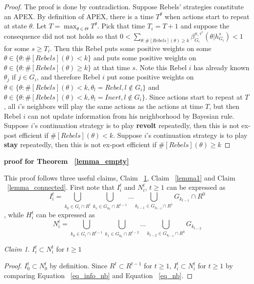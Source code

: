 \documentclass[12pt,letter]{article}
\theoremstyle{definition}
\theoremstyle{remark}
\theoremstyle{claim}
\newtheorem{claim}{Claim}
\begin{document}
\begin{proof}
The proof is done by contradiction. Suppose Rebels' strategies constitute an APEX. By definition of APEX, there is a time $T^{\theta}$ when actions start to repeat at state $\theta$. Let $T=\max_{\theta\in \Theta}{T^{\theta}}$. Pick that time $T_i=T+1$ and suppose the consequence did not not holds so that $0<\sum_{\theta:\#[Rebels](\theta)\geq k}\beta^{\pi,\tau^*}_{G_i}(\theta|h^{s}_{G_i})<1$ for some $s\geq T_i$. Then this Rebel puts some positive weights on some $\theta\in \{\theta:\#[Rebels](\theta)< k\}$ and puts some positive weights on $\theta\in \{\theta:\#[Rebels](\theta)\geq k\}$ at that time $s$. Note this Rebel $i$ has already known $\theta_j$ if $j\in G_i$, and therefore Rebel $i$ put some positive weights on $\theta\in \{\theta:\#[Rebels](\theta)< k, \theta_l=Rebel, l\notin G_i\}$ and $\theta\in \{\theta:\#[Rebels](\theta)< k, \theta_l=Inert, l\notin G_i\}$. Since actions start to repeat at $T$, all $i$'s neighbors will play the same actions as the actions at time $T$, but then Rebel $i$ can not update information from his neighborhood by Bayesian rule. Suppose $i$'s continuation strategy is to play \textbf{revolt} repeatedly, then this is not ex-post efficient if $\#[Rebels](\theta)< k$. Suppose $i$'s continuation strategy is to play \textbf{stay} repeatedly, then this is not ex-post efficient if $\#[Rebels](\theta)\geq k$
\end{proof}

\bigskip
\noindent\textbf{proof for Theorem ~\ref{lemma_empty}}

This proof follows three useful claims, Claim ~\ref{lemma_I_subset_N}, Claim ~\ref{lemma1} and Claim ~\ref{lemma_connected}. First note that $I^t_i$ and $N^t_i$, $t\geq 1$ can be expressed as 
\begin{equation}
\label{eq_info_nb}
I^{t}_i = \bigcup_{k_0\in G_i\cap R^{t}}\bigcup_{k_1\in G_{k_0}\cap R^{t-1}}...\bigcup_{k_{t-1}\in G_{k_{t-2}}\cap R^{1}}G_{k_{t-1}}\cap R^0
\end{equation}
, while $H^t_i$ can be expressed as
\begin{equation}
\label{eq_nb}
N^t_i = \bigcup_{k_0\in G_i\cap R^{t-1}}\bigcup_{k_1\in G_{k_0}\cap R^{t-2}}...\bigcup_{k_{t-2}\in G_{k_{t-3}}\cap R^{0}}G_{k_{t-2}}
\end{equation}

\begin{claim}
\label{lemma_I_subset_N}
$I^t_i\subset N^t_i$ for $t\geq 1$
\end{claim}
\begin{proof}
$I^t_0\subset N^t_0$ by definition. Since $R^t\subset R^{t-1}$ for $t\geq 1$, $I^t_i\subset N^t_i$ for $t\geq 1$ by comparing Equation ~\ref{eq_info_nb} and Equation ~\ref{eq_nb}.
\end{proof}
\end{document}
